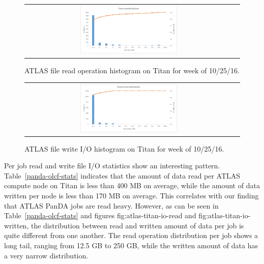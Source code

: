 \begin{figure}[!htb]
    \centering
    \begin{tabular}{cc}
        {\includegraphics[width=0.48\textwidth]{figures/panda_data_read_finer_hist.pdf}}\\
    \end{tabular}
    \caption{ATLAS file read operation histogram on Titan for week of 10/25/16.}
\label{fig:atlas-titan-io-read}
\end{figure}

\begin{figure}[!htb]
    \centering
    \begin{tabular}{cc}
        {\includegraphics[width=0.48\textwidth]{figures/panda_data_written_finer_hist.pdf}}\\
    \end{tabular}
    \caption{ATLAS file write I/O histogram on Titan for week of 10/25/16.}
\label{fig:atlas-titan-io-written}
\end{figure}

Per job read and write file I/O statistics show an interesting pattern.
Table~\ref{panda-olcf-stats} indicates that the amount of data read per ATLAS
compute node on Titan is less than 400 MB on average, while the amount of data
written per node is less than 170 MB on average. This correlates with our
finding that ATLAS PanDA jobs are read heavy. However, as can be seen in
Table~\ref{panda-olcf-stats} and figures {fig:atlas-titan-io-read} and
{fig:atlas-titan-io-written}, the distribution between read and written amount
of data per job is quite different from one another. The read operation
distribution per job shows a long tail, ranging from 12.5 GB to 250 GB, while
the written amount of data has a very narrow distribution.

